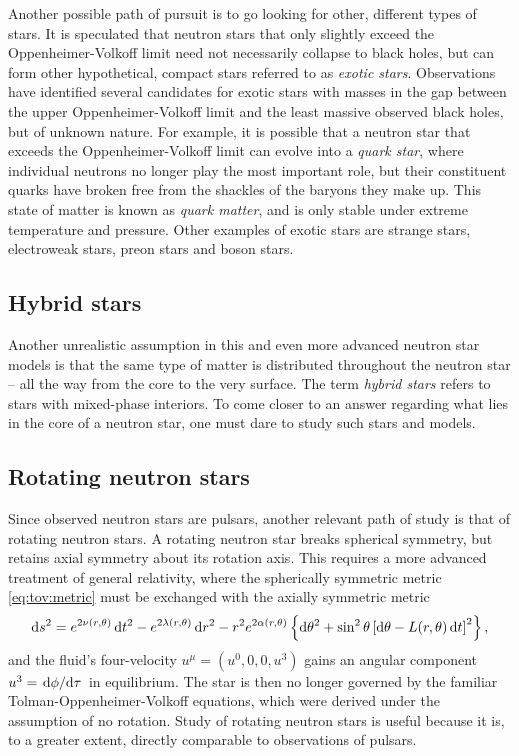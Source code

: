 Another possible path of pursuit is to go looking for other, different types of stars.
It is speculated that neutron stars that only slightly exceed the Oppenheimer-Volkoff limit need not necessarily collapse to black holes, but can form other hypothetical, compact stars referred to as \emph{exotic stars}.
Observations have identified several candidates for exotic stars with masses in the gap between the upper Oppenheimer-Volkoff limit and the least massive observed black holes, but of unknown nature. \cite{ref:wiki_list_star_massess}
For example, it is possible that a neutron star that exceeds the Oppenheimer-Volkoff limit can evolve into a \emph{quark star}, where individual neutrons no longer play the most important role, but their constituent quarks have broken free from the shackles of the baryons they make up.
This state of matter is known as \emph{quark matter}, and is only stable under extreme temperature and pressure. \cite[chapter 8]{ref:glendenning}
Other examples of exotic stars are strange stars, electroweak stars, preon stars and boson stars.

\subsection*{Hybrid stars}

Another unrealistic assumption in this and even more advanced neutron star models is that the same type of matter is distributed throughout the neutron star -- all the way from the core to the very surface.
The term \emph{hybrid stars} refers to stars with mixed-phase interiors. \cite[chapter 9]{ref:glendenning}
To come closer to an answer regarding what lies in the core of a neutron star, one must dare to study such stars and models.

\subsection*{Rotating neutron stars}

Since observed neutron stars are pulsars, another relevant path of study is that of rotating neutron stars.
A rotating neutron star breaks spherical symmetry, but retains axial symmetry about its rotation axis.
This requires a more advanced treatment of general relativity, where the spherically symmetric metric \eqref{eq:tov:metric} must be exchanged with the axially symmetric metric
\cite[section 6]{ref:glendenning}
\begin{equation}
	\mathop{}\!\mathrm{d} s^2 = e^{2\nu(r,\theta)} \mathop{}\!\mathrm{d} t^2 - e^{2\lambda(r,\theta)} \mathop{}\!\mathrm{d} r^2 - r^2 e^{2 \alpha(r,\theta)} \left\{ \mathop{}\!\mathrm{d} \theta^2 + \sin^2 \theta \left[ \mathop{}\!\mathrm{d} \theta - L(r,\theta) \mathop{}\!\mathrm{d} t \right]^2 \right\} ,
\end{equation}
and the fluid's four-velocity $u^\mu = (u^0, 0, 0, u^3)$ gains an angular component $u^3 = \odv{\phi}/{\tau}$ in equilibrium.
The star is then no longer governed by the familiar Tolman-Oppenheimer-Volkoff equations, which were derived under the assumption of no rotation.
Study of rotating neutron stars is useful because it is, to a greater extent, directly comparable to observations of pulsars.

